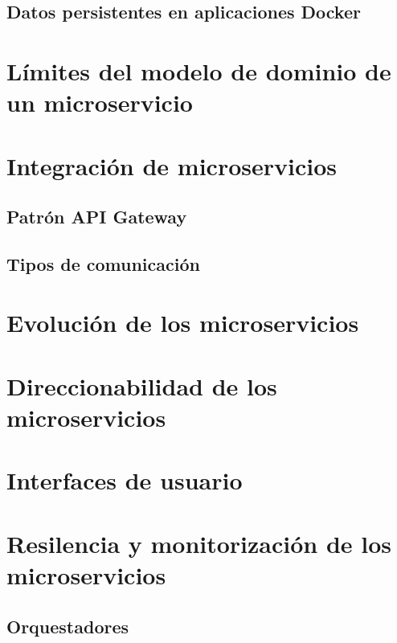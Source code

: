 \documentclass[11pt,a4paper]{article}
\begin{document}
\subsection{Datos persistentes en aplicaciones Docker}

\section{Límites del modelo de dominio de un microservicio}

\section{Integración de microservicios}

\subsection{Patrón API Gateway}

\subsection{Tipos de comunicación}

\section{Evolución de los microservicios}

\section{Direccionabilidad de los microservicios}

\section{Interfaces de usuario}

\section{Resilencia y monitorización de los microservicios}

\subsection{Orquestadores}
\end{document}
